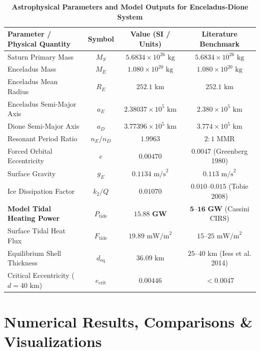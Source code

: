 \documentclass[11pt,a4paper]{article}
\begin{document}
\begin{table}[H]
\centering
\caption{\textbf{Astrophysical Parameters and Model Outputs for Enceladus-Dione System}}
\label{tab:params}
\begin{tabular}{lccc}
\toprule
\textbf{Parameter / Physical Quantity} & \textbf{Symbol} & \textbf{Value (SI / Units)} & \textbf{Literature Benchmark} \\
\midrule
Saturn Primary Mass & $M_S$ & $5.6834 \times 10^{26}\text{ kg}$ & $5.6834 \times 10^{26}\text{ kg}$ \\
Enceladus Mass & $M_E$ & $1.080 \times 10^{20}\text{ kg}$ & $1.080 \times 10^{20}\text{ kg}$ \\
Enceladus Mean Radius & $R_E$ & $252.1\text{ km}$ & $252.1\text{ km}$ \\
Enceladus Semi-Major Axis & $a_E$ & $2.38037 \times 10^5\text{ km}$ & $2.380 \times 10^5\text{ km}$ \\
Dione Semi-Major Axis & $a_D$ & $3.77396 \times 10^5\text{ km}$ & $3.774 \times 10^5\text{ km}$ \\
Resonant Period Ratio & $n_E / n_D$ & $1.9963$ & $2:1\text{ MMR}$ \\
Forced Orbital Eccentricity & $e$ & $0.00470$ & $0.0047$ (Greenberg 1980) \\
Surface Gravity & $g_E$ & $0.1134\text{ m/s}^2$ & $0.113\text{ m/s}^2$ \\
Ice Dissipation Factor & $k_2/Q$ & $0.01070$ & $0.010\text{--}0.015$ (Tobie 2008) \\
\textbf{Model Tidal Heating Power} & $P_{\text{tide}}$ & $\mathbf{15.88\text{ GW}}$ & $\mathbf{5\text{--}16\text{ GW}}$ (Cassini CIRS) \\
Surface Tidal Heat Flux & $F_{\text{tide}}$ & $19.89\text{ mW/m}^2$ & $15\text{--}25\text{ mW/m}^2$ \\
Equilibrium Shell Thickness & $d_{\text{eq}}$ & $36.09\text{ km}$ & $25\text{--}40\text{ km}$ (Iess et al. 2014) \\
Critical Eccentricity ($d=40\text{ km}$) & $e_{\text{crit}}$ & $0.00446$ & $< 0.0047$ \\
\bottomrule
\end{tabular}
\end{table}

\section{Numerical Results, Comparisons \& Visualizations}
\end{document}

